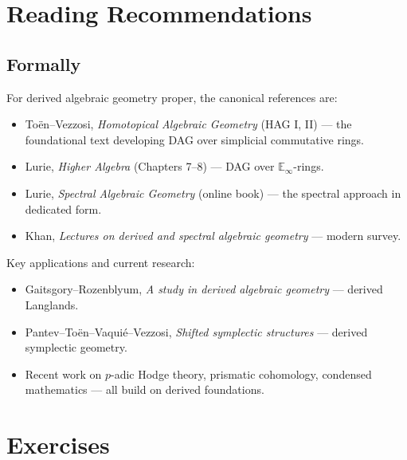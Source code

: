 \section{Reading Recommendations}
\label{sec:dag-reading}

\subsection{Formally}

\begin{remark}
For derived algebraic geometry proper, the canonical references are:
\begin{itemize}
  \item Toën–Vezzosi, \emph{Homotopical Algebraic Geometry} (HAG I, II)
        — the foundational text developing DAG over simplicial commutative
        rings.
  \item Lurie, \emph{Higher Algebra} (Chapters 7–8) — DAG over
        $\mathbb{E}_\infty$-rings.
  \item Lurie, \emph{Spectral Algebraic Geometry} (online book) — the
        spectral approach in dedicated form.
  \item Khan, \emph{Lectures on derived and spectral algebraic geometry}
        — modern survey.
\end{itemize}

Key applications and current research:
\begin{itemize}
  \item Gaitsgory–Rozenblyum, \emph{A study in derived algebraic geometry}
        — derived Langlands.
  \item Pantev–Toën–Vaquié–Vezzosi, \emph{Shifted symplectic structures}
        — derived symplectic geometry.
  \item Recent work on $p$-adic Hodge theory, prismatic cohomology,
        condensed mathematics — all build on derived foundations.
\end{itemize}
\end{remark}


\section{Exercises}
\label{sec:dag-exercises}

